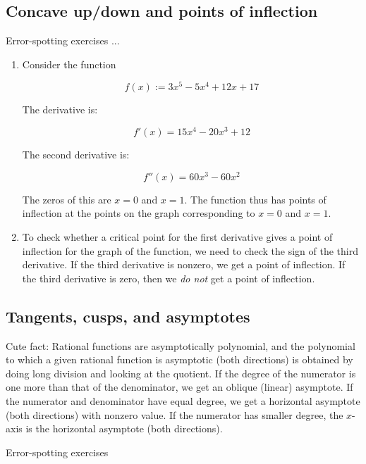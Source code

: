 \documentclass[10pt]{amsart}
\begin{document}
\subsection{Concave up/down and points of inflection}

Error-spotting exercises ...

\begin{enumerate}
\item Consider the function

  $$f(x) := 3x^5 - 5x^4 + 12x + 17$$

  The derivative is:

  $$f'(x) = 15x^4 - 20x^3 + 12$$

  The second derivative is:

  $$f''(x) = 60x^3 - 60x^2$$

  The zeros of this are $x = 0$ and $x = 1$. The function thus has
  points of inflection at the points on the graph corresponding to $x
  = 0$ and $x = 1$.
\item To check whether a critical point for the first derivative gives
  a point of inflection for the graph of the function, we need to
  check the sign of the third derivative. If the third derivative is
  nonzero, we get a point of inflection. If the third derivative is
  zero, then we {\em do not} get a point of inflection.
\end{enumerate}

\subsection{Tangents, cusps, and asymptotes}

Cute fact: Rational functions are asymptotically polynomial, and the
polynomial to which a given rational function is asymptotic (both
directions) is obtained by doing long division and looking at the
quotient. If the degree of the numerator is one more than that of the
denominator, we get an oblique (linear) asymptote. If the numerator
and denominator have equal degree, we get a horizontal asymptote (both
directions) with nonzero value. If the numerator has smaller degree,
the $x$-axis is the horizontal asymptote (both directions).

Error-spotting exercises
\end{document}
